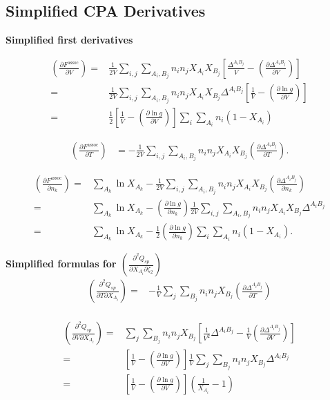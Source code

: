 \documentclass[english]{../thermomemo/thermomemo}
\newcommand*{\pder}[2]{\left(\frac{\partial #1}{\partial #2}\right)}
\newcommand*{\pdcross}[3]{\left(\frac{\partial^2 #1}{\partial #2 \partial #3}\right)}
\newcommand{\z}{\zeta}
\newcommand{\lp}{\left(}
\newcommand{\rp}{\right)}
\begin{document}
\subsection{Simplified CPA Derivatives}

\textbf{Simplified first derivatives}

\begin{align}
  \pder{F^{\text{assoc}}}{V} =& \frac{1}{2V} \sum_{i,j} \sum_{A_i, B_j} n_i n_j X_{A_i} X_{B_j} \left[ \frac{\Delta^{A_i B_j}}{V} - \pder{\Delta^{A_i B_j}}{V} \right] \\
  =& \frac{1}{2V} \sum_{i,j} \sum_{A_i, B_j} n_i n_j X_{A_i} X_{B_j} \Delta^{A_i B_j} \left[ \frac{1}{V} - \pder{\ln g}{V} \right] \\
  =& \frac{1}{2} \left[ \frac{1}{V} - \pder{\ln g}{V} \right] \sum_i \sum_{A_i} n_i (1- X_{A_i})
\end{align}

\begin{align}
  \pder{F^{\text{assoc}}}{T}  &= -\frac{1}{2V} \sum_{i,j} \sum_{A_i, B_j} n_i n_j X_{A_i} X_{B_j} \pder{\Delta^{A_i B_j}}{T}.
\end{align}

\begin{align}
  \pder{F^{\text{assoc}}}{n_k} =& \sum_{A_k} \ln X_{A_k} - \frac{1}{2V} \sum_{i,j} \sum_{A_i, B_j} n_i n_j X_{A_i} X_{B_j} \pder{\Delta^{A_i B_j}}{n_k} \\
  =& \sum_{A_k} \ln X_{A_k} - \pder{\ln g}{n_k} \frac{1}{2V} \sum_{i,j} \sum_{A_i, B_j} n_i n_j X_{A_i} X_{B_j} \Delta^{A_i B_j} \\
  =& \sum_{A_k} \ln X_{A_k} - \frac{1}{2} \pder{\ln g}{n_k} \sum_{i} \sum_{A_i} n_i (1-X_{A_i}).
\end{align}


\textbf{Simplified formulas for $\pdcross{Q_{sp}}{X_{A_i}}{\z_2}$}
\begin{align*}
  \pdcross{Q_{sp}}{T}{X_{A_i}} =& -\frac{1}{V} \sum_{j} \sum_{B_j} n_i n_j X_{B_j} \pder{\Delta^{A_i B_j}}{T} \\
\end{align*}

\begin{align*}
  \pdcross{Q_{sp}}{V}{X_{A_i}} =& \sum_{j} \sum_{B_j} n_i n_j X_{B_j} \left[ \frac{1}{V^2} \Delta^{A_i B_j} - \frac{1}{V} \pder{\Delta^{A_i B_j}}{V} \right] \\
  =& \left[ \frac{1}{V}  - \pder{\ln g}{V} \right] \frac{1}{V} \sum_{j} \sum_{B_j} n_i n_j X_{B_j} \Delta^{A_i B_j} \\
  =& \left[ \frac{1}{V}  - \pder{\ln g}{V} \right] \lp \frac{1}{X_{A_i}} - 1 \rp
\end{align*}
\end{document}
